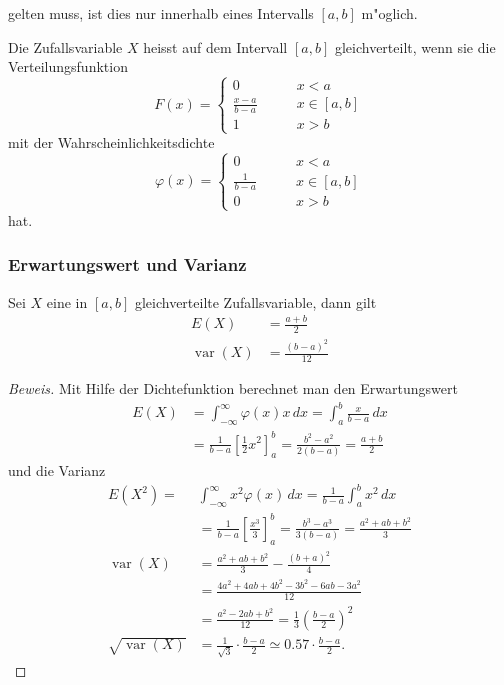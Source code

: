 gelten muss, ist dies nur innerhalb eines Intervalls $[a,b]$ m"oglich.
\begin{definition}Die Zufallsvariable $X$ heisst auf dem Intervall
$[a,b]$ gleichverteilt, wenn sie die Verteilungsfunktion
\[
F(x)=\begin{cases}
0&\qquad x< a\\
\displaystyle \frac{x-a}{b-a}&\qquad x\in[a,b]\\
1&\qquad x> b
\end{cases}
\]
mit der Wahrscheinlichkeitsdichte
\[
\varphi(x)=\begin{cases}
0&\qquad x< a\\
\displaystyle \frac1{b-a}&\qquad x\in[a,b]\\
0&\qquad x> b
\end{cases}
\]
hat.
\end{definition}

\subsubsection{Erwartungswert und Varianz}
\begin{satz}Sei $X$ eine in $[a,b]$ gleichverteilte Zufallsvariable,
dann gilt
\begin{align*}
E(X)&=\frac{a+b}2\\
\operatorname{var}(X)&=\frac{(b-a)^2}{12}
\end{align*}
\end{satz}
\begin{proof}[Beweis]
Mit Hilfe der Dichtefunktion berechnet man den Erwartungswert
\begin{align*}
E(X)&=\int_{-\infty}^\infty \varphi(x)x\,dx=\int_a^b\frac{x}{b-a}\,dx\\
&=\frac1{b-a}\left[\frac12x^2\right]_a^b=\frac{b^2-a^2}{2(b-a)}=\frac{a+b}2
\end{align*}
und die Varianz
\begin{align*}
E(X^2)=&\int_{-\infty}^\infty x^2\varphi(x)\,dx=\frac1{b-a}\int_a^bx^2\,dx\\
&=\frac1{b-a}\left[\frac{x^3}3\right]_a^b=\frac{b^3-a^3}{3(b-a)}=\frac{a^2+ab+b^2}3\\
\operatorname{var}(X)&=\frac{a^2+ab+b^2}3-\frac{(b+a)^2}4\\
&=\frac{4a^2+4ab+4b^2-3b^2-6ab-3a^2}{12}\\
&=\frac{a^2-2ab+b^2}{12}=\frac13\left(\frac{b-a}2\right)^2\\
\sqrt{\operatorname{var}(X)}&=\frac1{\sqrt{3}}\cdot\frac{b-a}2\simeq 0.57\cdot\frac{b-a}2.
\end{align*}

\end{proof}

